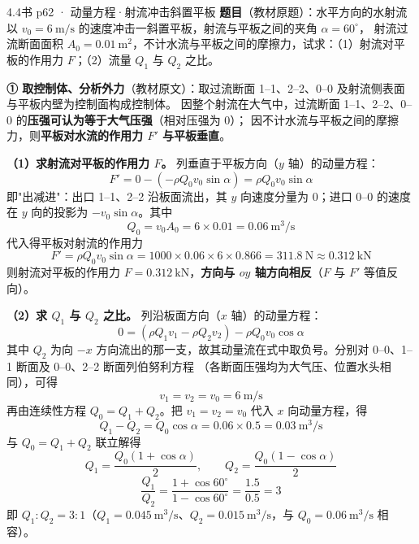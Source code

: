 \begin{liti}{4.4}{书 p62 · 动量方程·射流冲击斜置平板}
\textbf{题目}（教材原题）：水平方向的水射流以 $v_0=6\ \mathrm{m/s}$ 的速度冲击一斜置平板，射流与平板之间的夹角 $\alpha=60^{\circ}$，
射流过流断面面积 $A_0=0.01\ \mathrm{m^2}$，不计水流与平板之间的摩擦力，试求：（1）射流对平板的作用力 $F$；（2）流量 $Q_1$ 与 $Q_2$ 之比。


\begin{jie}
\textbf{① 取控制体、分析外力}（教材原文）：取过流断面 1--1、2--2、0--0 及射流侧表面与平板内壁为控制面构成控制体。
因整个射流在大气中，过流断面 1--1、2--2、0--0 的\textbf{压强可认为等于大气压强}（相对压强为 0）；
因不计水流与平板之间的摩擦力，则\textbf{平板对水流的作用力 $F'$ 与平板垂直}。

\textbf{（1）求射流对平板的作用力 $F$。} 列垂直于平板方向（$y$ 轴）的动量方程：
\[ F'=0-\left(-\rho Q_0v_0\sin\alpha\right)=\rho Q_0v_0\sin\alpha \]
即"出减进"：出口 1--1、2--2 沿板面流出，其 $y$ 向速度分量为 0；进口 0--0 的速度在 $y$ 向的投影为 $-v_0\sin\alpha$。其中
\[ Q_0=v_0A_0=6\times0.01=0.06\ \mathrm{m^3/s} \]
代入得平板对射流的作用力
\[ F'=\rho Q_0v_0\sin\alpha=1000\times0.06\times6\times0.866=311.8\ \mathrm{N}\approx0.312\ \mathrm{kN} \]
则射流对平板的作用力 $F=0.312\ \mathrm{kN}$，\textbf{方向与 $oy$ 轴方向相反}（$F$ 与 $F'$ 等值反向）。

\textbf{（2）求 $Q_1$ 与 $Q_2$ 之比。} 列沿板面方向（$x$ 轴）的动量方程：
\[ 0=\left(\rho Q_1v_1-\rho Q_2v_2\right)-\rho Q_0v_0\cos\alpha \]
其中 $Q_2$ 为向 $-x$ 方向流出的那一支，故其动量流在式中取负号。分别对 0--0、1--1 断面及 0--0、2--2 断面列伯努利方程
（各断面压强均为大气压、位置水头相同），可得
\[ v_1=v_2=v_0=6\ \mathrm{m/s} \]
再由连续性方程 $Q_0=Q_1+Q_2$。把 $v_1=v_2=v_0$ 代入 $x$ 向动量方程，得
\[ Q_1-Q_2=Q_0\cos\alpha=0.06\times0.5=0.03\ \mathrm{m^3/s} \]
与 $Q_0=Q_1+Q_2$ 联立解得
\[ Q_1=\frac{Q_0\left(1+\cos\alpha\right)}{2},\qquad Q_2=\frac{Q_0\left(1-\cos\alpha\right)}{2} \]
\[ \frac{Q_1}{Q_2}=\frac{1+\cos60^{\circ}}{1-\cos60^{\circ}}=\frac{1.5}{0.5}=3 \]
即 $Q_1\colon Q_2=3\colon1$（$Q_1=0.045\ \mathrm{m^3/s}$、$Q_2=0.015\ \mathrm{m^3/s}$，与 $Q_0=0.06\ \mathrm{m^3/s}$ 相容）。
\end{jie}
\end{liti}

